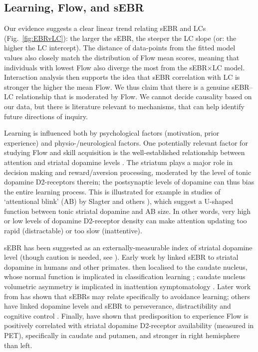 \documentclass[a4paper,doc,floatsintext,natbib,10pt]{apa6}
\begin{document}
\subsection*{Learning, Flow, and sEBR}
Our evidence suggests a clear linear trend relating sEBR and LCs (Fig.~\ref{fig:EBRvLC}): the larger the sEBR, the steeper the LC slope (or: the higher the LC intercept). The distance of data-points from the fitted model values also closely match the distribution of Flow mean scores, meaning that individuals with lowest Flow also diverge the most from the sEBR$\times$LC model. Interaction analysis then supports the idea that sEBR correlation with LC is stronger the higher the mean Flow. We thus claim that there is a genuine sEBR--LC relationship that is moderated by Flow. We cannot decide causality based on our data, but there is literature relevant to mechanisms, that can help identify future directions of inquiry.

Learning is influenced both by psychological factors (motivation, prior experience) and physio-/neurological factors. One potentially relevant factor for studying Flow and skill acquisition is the well-established relationship between attention and striatal dopamine levels \citep{Dreisbach2005}. The striatum plays a major role in decision making and reward/aversion processing, moderated by the level of tonic dopamine D2-receptors therein; the postsynaptic levels of dopamine can thus bias the entire learning process. This is illustrated for example in studies of `attentional blink' (AB) by Slagter and others \citep{Slagter2012,COLZATO2008}), which suggest a U-shaped function between tonic striatal dopamine and AB size. In other words, very high or low levels of dopamine D2-receptor density can make attention updating too rapid (distractable) or too slow (inattentive).

sEBR has been suggested as an externally-measurable index of striatal dopamine level (though caution is needed, see \cite{dang2017spontaneous}). Early work by \cite{Karson1983} linked sEBR to striatal dopamine in humans and other primates. \cite{Taylor1999} then localised to the caudate nucleus, whose normal function is implicated in classification learning \citep{Seger2005}; caudate nucleus volumetric asymmetry is implicated in inattention symptomatology \citep{Schrimsher2002}. Later work from \cite{Slagter2015} has shown that sEBRs may relate specifically to avoidance learning; others have linked dopamine levels and sEBR to perseverance, distractibility and cognitive control \citep{Muller2007,Dreisbach2005}. Finally, \cite{DeManzano2013} have shown that  predisposition to experience Flow is positively correlated with striatal dopamine D2-receptor availability (measured in PET), specifically in caudate and putamen, and stronger in right hemisphere than left.
\end{document}
